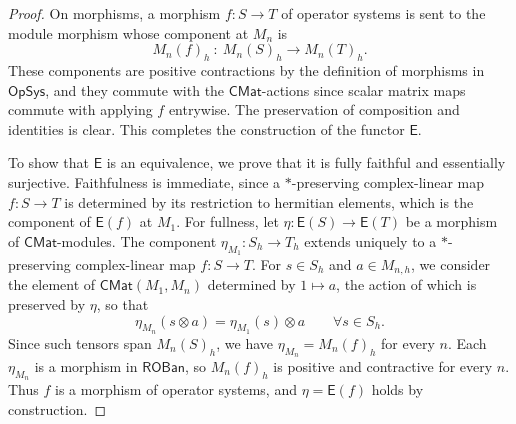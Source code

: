\documentclass[11pt,onecolumn]{article}
\newcommand{\ROBan}{\mathsf{ROBan}}
\newcommand{\OpSys}{\mathsf{OpSys}}
\theoremstyle{plain}
\theoremstyle{remark}
\theoremstyle{definition}
\begin{document}
\begin{proof}
	On morphisms, a morphism $f \colon S \to T$ of operator systems is sent to the module morphism whose component at $M_n$ is
	\[
		M_n(f)_h \: : \: M_n(S)_h \longrightarrow M_n(T)_h.
	\]
	These components are positive contractions by the definition of morphisms in $\OpSys$,
	and they commute with the $\mathsf{CMat}$-actions since scalar matrix maps commute with applying $f$ entrywise.
	The preservation of composition and identities is clear.
	This completes the construction of the functor $\mathsf{E}$.

	To show that $\mathsf{E}$ is an equivalence, we prove that it is fully faithful and essentially surjective.
	Faithfulness is immediate, since a $*$-preserving complex-linear map $f : S \to T$ is determined by its restriction to hermitian elements,
	which is the component of $\mathsf{E}(f)$ at $M_1$.
	For fullness, let $\eta \colon \mathsf{E}(S) \to \mathsf{E}(T)$ be a morphism of $\mathsf{CMat}$-modules.
	The component $\eta_{M_1} \colon S_h \to T_h$ extends uniquely to a $*$-preserving complex-linear map $f \colon S \to T$.
	For $s \in S_h$ and $a \in M_{n,h}$, we consider the element of $\mathsf{CMat}(M_1,M_n)$ determined by $1 \mapsto a$,
	the action of which is preserved by $\eta$, so that
	\[
		\eta_{M_n}(s \otimes a) = \eta_{M_1}(s) \otimes a
		\qquad
		\forall s \in S_h.
	\]
	Since such tensors span $M_n(S)_h$, we have $\eta_{M_n} = M_n(f)_h$ for every $n$.
	Each $\eta_{M_n}$ is a morphism in $\ROBan$, so $M_n(f)_h$ is positive and contractive for every $n$.
	Thus $f$ is a morphism of operator systems, and $\eta = \mathsf{E}(f)$ holds by construction.


\end{proof}
\end{document}
